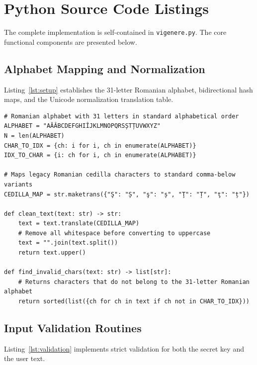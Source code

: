 \documentclass[11pt,a4paper]{article}
\begin{document}
\newpage
\section{Python Source Code Listings}

The complete implementation is self-contained in \texttt{vigenere.py}. The core functional components are presented below.

\subsection{Alphabet Mapping and Normalization}

Listing~\ref{lst:setup} establishes the 31-letter Romanian alphabet, bidirectional hash maps, and the Unicode normalization translation table.

\begin{lstlisting}[style=pythoncode,caption={Alphabet definition and character normalization},label={lst:setup}]
# Romanian alphabet with 31 letters in standard alphabetical order
ALPHABET = "AĂÂBCDEFGHIÎJKLMNOPQRSȘTȚUVWXYZ"
N = len(ALPHABET)
CHAR_TO_IDX = {ch: i for i, ch in enumerate(ALPHABET)}
IDX_TO_CHAR = {i: ch for i, ch in enumerate(ALPHABET)}

# Maps legacy Romanian cedilla characters to standard comma-below variants
CEDILLA_MAP = str.maketrans({"Ş": "Ș", "ş": "ș", "Ţ": "Ț", "ţ": "ț"})

def clean_text(text: str) -> str:
    text = text.translate(CEDILLA_MAP)
    # Remove all whitespace before converting to uppercase
    text = "".join(text.split())
    return text.upper()

def find_invalid_chars(text: str) -> list[str]:
    # Returns characters that do not belong to the 31-letter Romanian alphabet
    return sorted(list({ch for ch in text if ch not in CHAR_TO_IDX}))
\end{lstlisting}

\subsection{Input Validation Routines}

Listing~\ref{lst:validation} implements strict validation for both the secret key and the user text.
\end{document}
